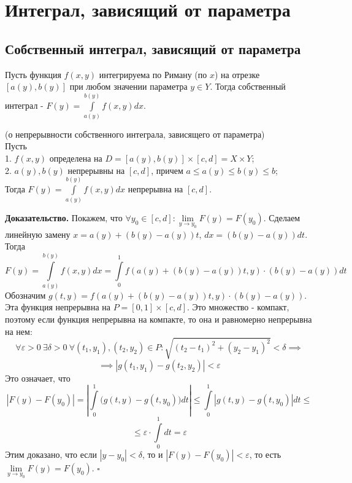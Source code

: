 \chapter{Интеграл, зависящий от параметра}
\section{Собственный интеграл, зависящий от параметра}
\begin{defin}
    Пусть функция $f(x,y)$ интегрируема по Риману (по $x$) 
    на отрезке $[a(y),b(y)]$
    при любом значении параметра  $y\in Y$. Тогда собственный интеграл - 
    $F(y)=\int\limits_{a(y)}^{b(y)}f(x,y)dx$.
\end{defin}

\begin{theor}
    (о непрерывности собственного интеграла, зависящего от параметра)\\
    Пусть\\
    1. $f(x,y)$ определена на  $D=[a(y),b(y)]\times [c,d]=X\times Y$;\\
    2. $a(y),b(y)$ непрерывны на  $[c,d]$, причем
    $a\leqslant a(y)\leqslant b(y)\leqslant b$;\\
    Тогда $F(y)=\int\limits_{a(y)}^{b(y)}f(x,y)dx$ непрерывна на $[c,d]$.
\end{theor}
\textbf{Доказательство.} Покажем, что $\forall y_0\in [c,d]:
\lim\limits_{y \to y_0}F(y)=F(y_0)$. Сделаем линейную замену
$x=a(y)+(b(y)-a(y))t$, $dx=(b(y)-a(y))dt$. Тогда
$$F(y)=\int\limits_{a(y)}^{b(y)}f(x,y)dx=\int\limits_{0}^{1}
f(a(y)+(b(y)-a(y))t,y)\cdot (b(y)-a(y))dt$$
Обозначим $g(t,y)=f(a(y)+(b(y)-a(y))t,y)\cdot (b(y)-a(y))$. Эта функция 
непрерывна на $P=[0,1]\times [c,d]$. Это множество - компакт, поэтому если 
функция непрерывна на компакте, то она и равномерно непрерывна на нем:
$$\forall \varepsilon>0~\exists \delta>0~\forall (t_1,y_1),(t_2,y_2)\in P:
\sqrt{(t_2-t_1)^2+(y_2-y_1)^2}<\delta\implies $$
$$\implies |g(t_1,y_1)-g(t_2,y_2)|<\varepsilon$$ 
Это означает, что
$$|F(y)-F(y_0)|=\left| \int\limits_{0}^{1}\big(g(t,y)-g(t,y_0)\big)dt\right|
\leqslant \int\limits_{0}^{1}|g(t,y)-g(t,y_0)|dt\leqslant 
$$
$$\leqslant \varepsilon\cdot \int\limits_{0}^{1}dt=\varepsilon$$
Этим доказано, что если $|y-y_0|<\delta$, то и $|F(y)-F(y_0)|<
\varepsilon$, то есть $\lim\limits_{y \to y_0}F(y)=F(y_0)$. $\square$ 

